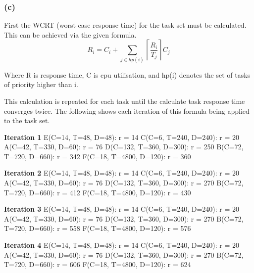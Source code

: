 \documentclass[]{report}
\begin{document}
			
			
			
			\subsubsection{(c)}
			First the WCRT (worst case response time) for the task set must be calculated. This can be achieved via the given formula.
			\begin{equation*}
			R_i = C_i + \sum_{j \in hp(i)} \left\lceil \frac{R_i}{T_j} \right\rceil C_j
			\end{equation*}
			
			Where R is response time, C is cpu utilisation, and hp(i) denotes the set of tasks of priority higher than i.

			This calculation is repeated for each task until the calculate task response time converges twice. The following shows each iteration of this formula being applied to the task set.

		\textbf{Iteration 1}
		E(C=14, T=48, D=48): r = 14
		C(C=6, T=240, D=240): r = 20
		A(C=42, T=330, D=60): r = 76
		D(C=132, T=360, D=300): r = 250
		B(C=72, T=720, D=660): r = 342
		F(C=18, T=4800, D=120): r = 360

		\textbf{Iteration 2}
		E(C=14, T=48, D=48): r = 14
		C(C=6, T=240, D=240): r = 20
		A(C=42, T=330, D=60): r = 76
		D(C=132, T=360, D=300): r = 270
		B(C=72, T=720, D=660): r = 412
		F(C=18, T=4800, D=120): r = 430


		\textbf{Iteration 3}
		E(C=14, T=48, D=48): r = 14
		C(C=6, T=240, D=240): r = 20
		A(C=42, T=330, D=60): r = 76
		D(C=132, T=360, D=300): r = 270
		B(C=72, T=720, D=660): r = 558
		F(C=18, T=4800, D=120): r = 576

		\textbf{Iteration 4}
		E(C=14, T=48, D=48): r = 14
		C(C=6, T=240, D=240): r = 20
		A(C=42, T=330, D=60): r = 76
		D(C=132, T=360, D=300): r = 270
		B(C=72, T=720, D=660): r = 606
		F(C=18, T=4800, D=120): r = 624
\end{document}
